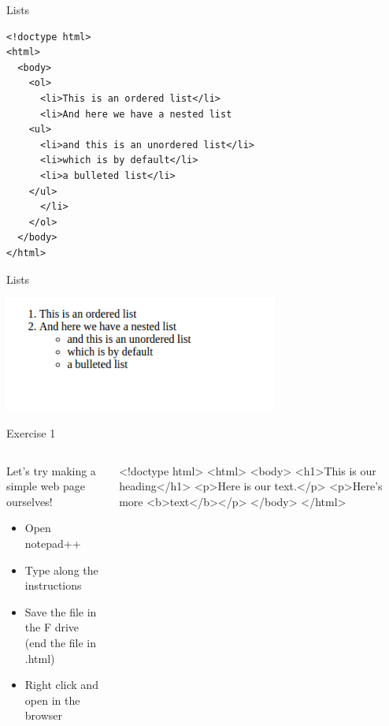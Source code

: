 \documentclass{beamer}
\begin{document}
\begin{frame}[fragile]{Lists}
  \begin{block}{}
    \begin{verbatim}
<!doctype html>
<html>
  <body>
    <ol>
      <li>This is an ordered list</li>
      <li>And here we have a nested list
	<ul>
	  <li>and this is an unordered list</li>
	  <li>which is by default</li>
	  <li>a bulleted list</li>
	</ul>
      </li>
    </ol>
  </body>
</html>
    \end{verbatim}
  \end{block}
\end{frame}

\begin{frame}{Lists}
  \begin{block}{}
    \includegraphics[width=9cm]{listylists.png}
  \end{block}
\end{frame}

\begin{frame}[fragile]{Exercise 1}
\begin{columns}
\begin{column}{0.4\columnwidth}
  \begin{block}{}
    Let's try making a simple web page ourselves!
    \begin{itemize}
      \item Open notepad++
      \item Type along the instructions
      \item Save the file in the F drive (end the file in .html)
      \item Right click and open in the browser
    \end{itemize}
  \end{block}
\end{column}
\begin{column}{0.5\columnwidth}
  \begin{semiverbatim}
 <!doctype html>
 <html>
  <body>
   <h1>This is our heading</h1>
   <p>Here is our text.</p>
   <p>Here's more <b>text</b></p>
  </body>
 </html>
  \end{semiverbatim}
\end{column}
\end{columns}
\end{frame}
\end{document}
